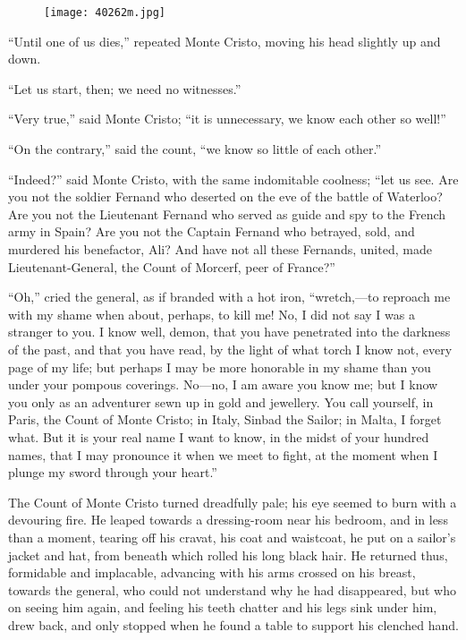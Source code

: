 \begin{figure}[ht]
\texttt{[image: 40262m.jpg]}
\end{figure}

“Until one of us dies,” repeated Monte Cristo, moving his head slightly
up and down.

“Let us start, then; we need no witnesses.”

“Very true,” said Monte Cristo; “it is unnecessary, we know each other
so well!”

“On the contrary,” said the count, “we know so little of each other.”

“Indeed?” said Monte Cristo, with the same indomitable coolness; “let
us see. Are you not the soldier Fernand who deserted on the eve of the
battle of Waterloo? Are you not the Lieutenant Fernand who served as
guide and spy to the French army in Spain? Are you not the Captain
Fernand who betrayed, sold, and murdered his benefactor, Ali? And have
not all these Fernands, united, made Lieutenant-General, the Count of
Morcerf, peer of France?”

“Oh,” cried the general, as if branded with a hot iron, “wretch,—to
reproach me with my shame when about, perhaps, to kill me! No, I did
not say I was a stranger to you. I know well, demon, that you have
penetrated into the darkness of the past, and that you have read, by
the light of what torch I know not, every page of my life; but perhaps
I may be more honorable in my shame than you under your pompous
coverings. No—no, I am aware you know me; but I know you only as an
adventurer sewn up in gold and jewellery. You call yourself, in Paris,
the Count of Monte Cristo; in Italy, Sinbad the Sailor; in Malta, I
forget what. But it is your real name I want to know, in the midst of
your hundred names, that I may pronounce it when we meet to fight, at
the moment when I plunge my sword through your heart.”

The Count of Monte Cristo turned dreadfully pale; his eye seemed to
burn with a devouring fire. He leaped towards a dressing-room near his
bedroom, and in less than a moment, tearing off his cravat, his coat
and waistcoat, he put on a sailor’s jacket and hat, from beneath which
rolled his long black hair. He returned thus, formidable and
implacable, advancing with his arms crossed on his breast, towards the
general, who could not understand why he had disappeared, but who on
seeing him again, and feeling his teeth chatter and his legs sink under
him, drew back, and only stopped when he found a table to support his
clenched hand.

